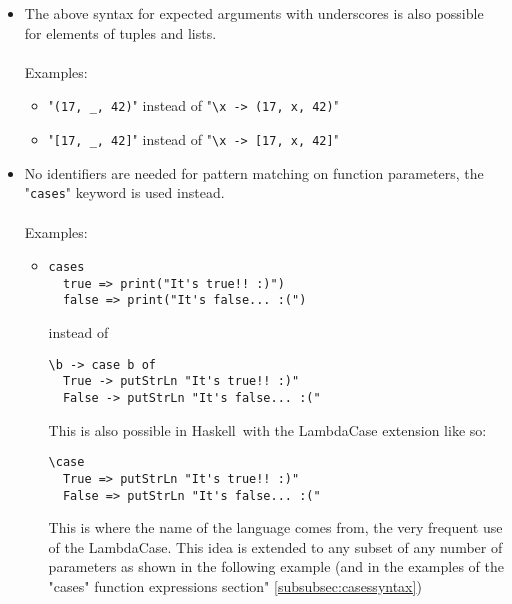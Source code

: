 \documentclass[diploma]{softlab-thesis}
\def\H{Haskell}
\begin{document}
\begin{itemize}
\begin{itemize}


\item
"\verb|"Hello " + _ + "! You look much younger than " + _ + "!"|"
\\ instead of \\
"\verb|\name age -> "Hello " ++ name ++ "! You look much younger than " + age + "!"|"

\item
"\verb|_^2 + _^2|" instead of "\verb|\x y -> x^2 + y^2|"

\item
etc

\end{itemize}

\item
The above syntax for expected arguments with underscores is also possible
for elements of tuples and lists.
\\\\
Examples:\\
\begin{itemize}

\item
"\verb|(17, _, 42)|" instead of "\verb|\x -> (17, x, 42)|"

\item
"\verb|[17, _, 42]|" instead of "\verb|\x -> [17, x, 42]|"

\end{itemize}

\newpage
\item
No identifiers are needed for pattern matching on function parameters,
the "\texttt{cases}" keyword is used instead.
\\\\
Examples:\\

\begin{itemize}

\item
\begin{verbatim}
cases
  true => print("It's true!! :)")
  false => print("It's false... :(")
\end{verbatim}
instead of
\begin{verbatim}
\b -> case b of
  True -> putStrLn "It's true!! :)"
  False -> putStrLn "It's false... :("
\end{verbatim}
This is also possible in \H\ with the LambdaCase extension like so:
\begin{verbatim}
\case
  True => putStrLn "It's true!! :)"
  False => putStrLn "It's false... :("
\end{verbatim}
This is where the name of the language comes from, the very frequent use
of the LambdaCase. This idea is extended to any subset of any number of
parameters as shown in the following example (and in the examples of
the "cases" function expressions section" \ref{subsubsec:casessyntax})


\end{itemize}
\end{itemize}
\end{document}
